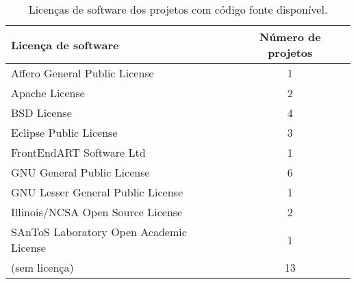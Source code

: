 

\begin{table}[h]
\caption{Licenças de software dos projetos com código fonte disponível.}
\centering
\begin{tabular}{| l | c |}
  \hline
  {\bf Licença de software} & {\bf Número de projetos} \\
  \hline
  Affero General Public License & 1 \\
  Apache License & 2 \\
  BSD License & 4 \\
  Eclipse Public License & 3 \\
  FrontEndART Software Ltd & 1 \\
  GNU General Public License & 6 \\
  GNU Lesser General Public License & 1 \\
  Illinois/NCSA Open Source License & 2 \\
  SAnToS Laboratory Open Academic License & 1 \\
  (sem licença) & 13 \\
  \hline
\end{tabular}
\label{license-table}
\end{table}

